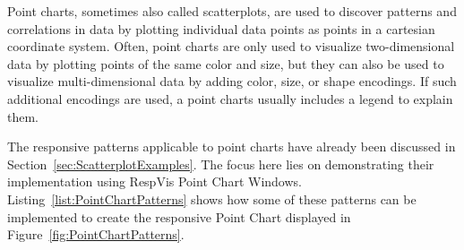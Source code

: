 Point charts, sometimes also called scatterplots, are used to discover
patterns and correlations in data by plotting individual data points
as points in a cartesian coordinate system. Often, point charts are
only used to visualize two-dimensional data by plotting points of the
same color and size, but they can also be used to visualize
multi-dimensional data by adding color, size, or shape encodings. If
such additional encodings are used, a point charts usually includes a
legend to explain them.

The responsive patterns applicable to point charts have already been
discussed in Section~\ref{sec:ScatterplotExamples}. The focus here
lies on demonstrating their implementation using RespVis Point Chart
Windows. Listing~\ref{list:PointChartPatterns} shows how some of
these patterns can be implemented to create the responsive Point Chart
displayed in Figure~\ref{fig:PointChartPatterns}.


